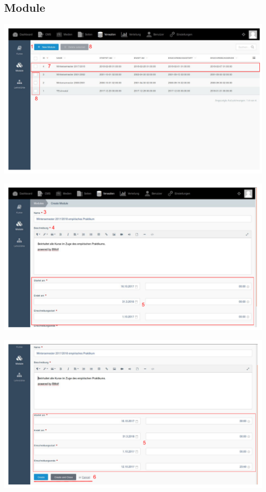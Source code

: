     \subsection{Module}
    
    \includegraphics[scale=0.3]{backend/img/module_1.pdf}

    \includegraphics[scale=0.3]{backend/img/module_2.pdf}

    \includegraphics[scale=0.3]{backend/img/module_3.pdf}
    
